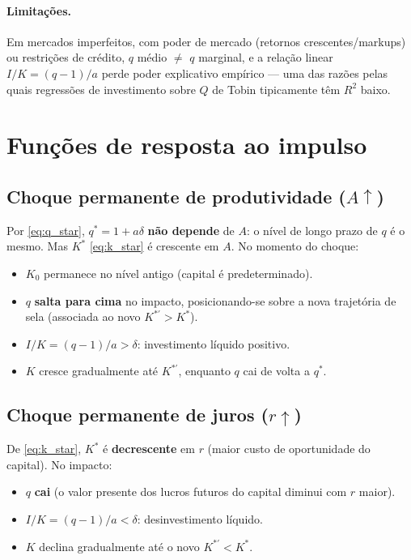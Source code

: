 \documentclass[11pt,a4paper]{article}
\begin{document}
\paragraph{Limitações.} Em mercados imperfeitos, com poder de mercado
(retornos crescentes/markups) ou restrições de crédito, $q$ médio $\neq$
$q$ marginal, e a relação linear $I/K=(q-1)/a$ perde poder explicativo
empírico --- uma das razões pelas quais regressões de investimento sobre
$Q$ de Tobin tipicamente têm $R^2$ baixo.

\section{Funções de resposta ao impulso}

\subsection{Choque permanente de produtividade ($A \uparrow$)}

Por \eqref{eq:q_star}, $q^*=1+a\delta$ \textbf{não depende} de $A$: o
nível de longo prazo de $q$ é o mesmo. Mas $K^*$ \eqref{eq:k_star} é
crescente em $A$. No momento do choque:
\begin{itemize}
  \item $K_0$ permanece no nível antigo (capital é predeterminado).
  \item $q$ \textbf{salta para cima} no impacto, posicionando-se sobre a
    nova trajetória de sela (associada ao novo $K^{*\prime}>K^*$).
  \item $I/K = (q-1)/a > \delta$: investimento líquido positivo.
  \item $K$ cresce gradualmente até $K^{*\prime}$, enquanto $q$ cai de
    volta a $q^*$.
\end{itemize}

\subsection{Choque permanente de juros ($r \uparrow$)}

De \eqref{eq:k_star}, $K^*$ é \textbf{decrescente} em $r$ (maior custo de
oportunidade do capital). No impacto:
\begin{itemize}
  \item $q$ \textbf{cai} (o valor presente dos lucros futuros do capital
    diminui com $r$ maior).
  \item $I/K = (q-1)/a < \delta$: desinvestimento líquido.
  \item $K$ declina gradualmente até o novo $K^{*\prime}<K^*$.
\end{itemize}
\end{document}

